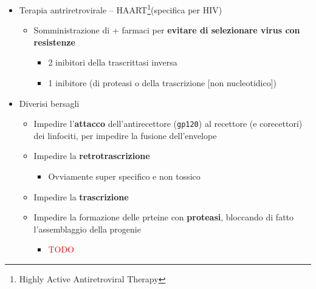 \documentclass[italian,]{article}
\providecommand{\tightlist}{%
  \setlength{\itemsep}{0pt}\setlength{\parskip}{0pt}}
\newcommand{\TODO}[1]{\textcolor{red}{\textsf{\footnotesize{TODO #1}}}} %
\begin{document}
\begin{itemize}
\tightlist
\item
  Terapia antriretrovirale -- HAART\footnote{Highly Active
    Antiretroviral Therapy}(specifica per HIV)

  \begin{itemize}
  \tightlist
  \item
    Somministrazione di + farmaci per \textbf{evitare di selezionare
    virus con resistenze}

    \begin{itemize}
    \tightlist
    \item
      2 inibitori della trascrittasi inversa
    \item
      1 inibitore (di proteasi o della trascrizione {[}non
      nucleotidico{]})
    \end{itemize}
  \end{itemize}
\item
  Diverisi bersagli

  \begin{itemize}
  \tightlist
  \item
    Impedire l'\textbf{attacco} dell'antirecettore (\texttt{gp120}) al
    recettore (e corecettori) dei linfociti, per impedire la fusione
    dell'envelope
  \item
    Impedire la \textbf{retrotrascrizione}

    \begin{itemize}
    \tightlist
    \item
      Ovviamente super specifico e non tossico
    \end{itemize}
  \item
    Impedire la \textbf{trascrizione}
  \item
    Impedire la formazione delle prteine con \textbf{proteasi},
    bloccando di fatto l'assemblaggio della progenie

    \begin{itemize}
    \item
      \TODO{}
    \end{itemize}
  \end{itemize}
\end{itemize}
\end{document}
